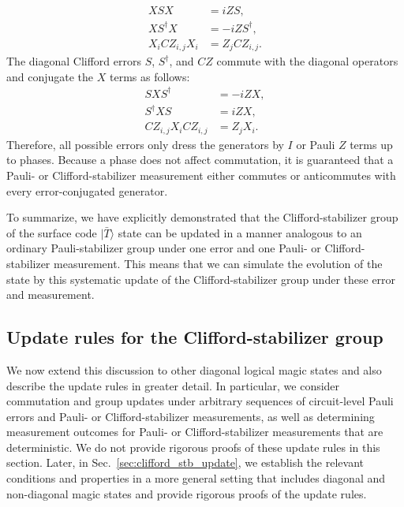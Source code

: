 \documentclass[
 reprint,
 amsmath,amssymb,
 pra,superscriptaddress, nofootinbib
]{revtex4-2}
\theoremstyle{definition}
\theoremstyle{plain}
\begin{document}
\begin{align}
XSX&=iZS,
\label{eq:diagonal_dressing_ex_1}
\\
XS^\dagger X&=-iZS^\dagger,
\\
X_iCZ_{i,j}X_i&=Z_jCZ_{i,j}.
\end{align}
The diagonal Clifford errors $S$, $S^\dagger$, and $CZ$ commute with the diagonal operators and conjugate the $X$ terms as follows:
\begin{align}
SXS^\dagger&=-iZX,
\\
S^\dagger X S&=iZX,
\\
CZ_{i,j}X_iCZ_{i,j}&=Z_jX_i.
\label{eq:diagonal_dressing_ex_2}
\end{align}
Therefore, all possible errors only dress the generators by $I$ or Pauli $Z$ terms up to phases. Because a phase does not affect commutation, it is guaranteed that a Pauli- or Clifford-stabilizer measurement either commutes or anticommutes with every error-conjugated generator. 

To summarize, we have explicitly demonstrated that the Clifford-stabilizer group of the surface code $|\bar{T}\rangle$ state can be updated in a manner analogous to an ordinary Pauli-stabilizer group under one error and one Pauli- or Clifford-stabilizer measurement. 
This means that we can simulate the evolution of the state by this systematic update of the Clifford-stabilizer group under these error and measurement.

\subsection{Update rules for the Clifford-stabilizer group}
\label{subsec:rules_diagonal}
We now extend this discussion to other diagonal logical magic states and also describe the update rules in greater detail. In particular, we consider commutation and group updates under arbitrary sequences of circuit-level Pauli errors and Pauli- or Clifford-stabilizer measurements, as well as determining measurement outcomes for Pauli- or Clifford-stabilizer measurements that are deterministic. We do not provide rigorous proofs of these update rules in this section.
Later, in Sec.~\ref{sec:clifford_stb_update}, we establish the relevant conditions and properties in a more general setting that includes diagonal and non-diagonal magic states and provide rigorous proofs of the update rules.
\end{document}
